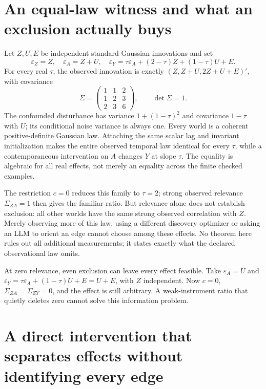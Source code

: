 \hypertarget{an-equal-law-witness-and-what-an-exclusion-actually-buys}{%
\section{An equal-law witness and what an exclusion actually
buys}\label{an-equal-law-witness-and-what-an-exclusion-actually-buys}}

Let \(Z,U,E\) be independent standard Gaussian innovations and set \[
 \varepsilon_Z=Z,\quad \varepsilon_A=Z+U,\quad
 \varepsilon_Y=\tau\varepsilon_A+(2-\tau)Z+(1-\tau)U+E.
\] For every real \(\tau\), the observed innovation is exactly
\((Z,Z+U,2Z+U+E)'\), with covariance \[
 \Sigma=\begin{pmatrix}1&1&2\\1&2&3\\2&3&6\end{pmatrix},
 \qquad\det\Sigma=1.
\] The confounded disturbance has variance \(1+(1-\tau)^2\) and
covariance \(1-\tau\) with \(U\); its conditional noise variance is
always one. Every world is a coherent positive-definite Gaussian law.
Attaching the same scalar lag and invariant initialization makes the
entire observed temporal law identical for every \(\tau\), while a
contemporaneous intervention on \(A\) changes \(Y\) at slope \(\tau\).
The equality is algebraic for all real effects, not merely an equality
across the finite checked examples.

The restriction \(c=0\) reduces this family to \(\tau=2\); strong
observed relevance \(\Sigma_{ZA}=1\) then gives the familiar ratio. But
relevance alone does not establish exclusion: all other worlds have the
same strong observed correlation with \(Z\). Merely observing more of
this law, using a different discovery optimizer or asking an LLM to
orient an edge cannot choose among these effects. No theorem here rules
out all additional measurements; it states exactly what the declared
observational law omits.

At zero relevance, even exclusion can leave every effect feasible. Take
\(\varepsilon_A=U\) and
\(\varepsilon_Y=\tau\varepsilon_A+(1-\tau)U+E=U+E\), with \(Z\)
independent. Now \(c=0\), \(\Sigma_{ZA}=\Sigma_{ZY}=0\), and the effect
is still arbitrary. A weak-instrument ratio that quietly deletes zero
cannot solve this information problem.

\hypertarget{a-direct-intervention-that-separates-effects-without-identifying-every-edge}{%
\section{A direct intervention that separates effects without
identifying every
edge}\label{a-direct-intervention-that-separates-effects-without-identifying-every-edge}}

